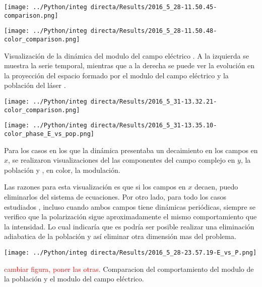 	\begin{minipage}{0.5\textwidth}
		
		\centering
		\texttt{[image: ../Python/integ directa/Results/2016\_5\_28-11.50.45-comparison.png]}
		\label{fig: ej mod}
		
	\end{minipage}
	\begin{minipage}{0.5\textwidth}
		
		\centering
		\texttt{[image: ../Python/integ directa/Results/2016\_5\_28-11.50.48-color\_comparison.png]}
		
	\end{minipage}
	
	Visualización de la dinámica del modulo del campo eléctrico . A la izquierda se muestra la serie temporal, mientras que a la derecha se puede ver la evolución en la proyección del espacio formado por el modulo del campo eléctrico y la población del láser .
	
	\begin{minipage}{0.5\textwidth}
		
		\centering
		\texttt{[image: ../Python/integ directa/Results/2016\_5\_31-13.32.21-color\_comparison.png]}
		
	\end{minipage}
	\begin{minipage}{0.5\textwidth}
		
		\centering
		\texttt{[image: ../Python/integ directa/Results/2016\_5\_31-13.35.10-color\_phase\_E\_vs\_pop.png]}
		
	\end{minipage}
	
	
	Para los casos en los que la dinámica presentaba un decaimiento en los campos en $x$, se realizaron visualizaciones del las componentes del campo complejo en $y$, la población y , en color, la modulación.
	
	Las razones para esta visualización es que si los campos en $x$ decaen, puedo eliminarlos del sistema de ecuaciones. Por otro lado, para todo los casos estudiados , incluso cuando ambos campos tiene dinámicas periódicas, siempre se verifico que la polarización sigue aproximadamente el mismo comportamiento que la intensidad. Lo cual indicaría que es podría ser posible realizar una eliminación adiabatica de la población y así eliminar otra dimensión mas del problema. 
	\begin{center}
		\texttt{[image: ../Python/integ directa/Results/2016\_5\_28-23.57.19-E\_vs\_P.png]}
	\end{center}
	\textcolor{red}{cambiar figura, poner las otras.}
	Comparacion del comportamiento del modulo de la población y el modulo del campo eléctrico.
	
